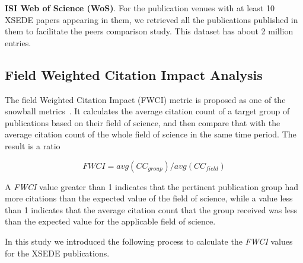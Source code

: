 \documentclass[sigconf]{acmart}
\begin{document}
\parindent 0pt \textbf{ISI Web of Science (WoS)}. For the publication
venues with at least 10 XSEDE papers appearing in them, we retrieved
all the publications published in them to facilitate the peers
comparison study. This dataset has about 2 million entries.

\subsection{Field Weighted Citation Impact Analysis}

The field Weighted Citation Impact (FWCI) metric is proposed as one of
the snowball metrics~\cite{colledge2014snowball}. It calculates the
average citation count of a target group of publications based on
their field of science, and then compare that with the average
citation count of the whole field of science in the same time
period. The result is a ratio

\[ FWCI = avg(CC_{group})/avg(CC_{field}) \]

A \emph{FWCI} value greater than 1 indicates that the pertinent
publication group had more citations than the expected value of the
field of science, while a value less than 1 indicates that the average
citation count that the group received was less than the expected
value for the applicable field of science.

In this study we introduced the following process to calculate the \emph{FWCI}
values for the XSEDE publications.
\end{document}

